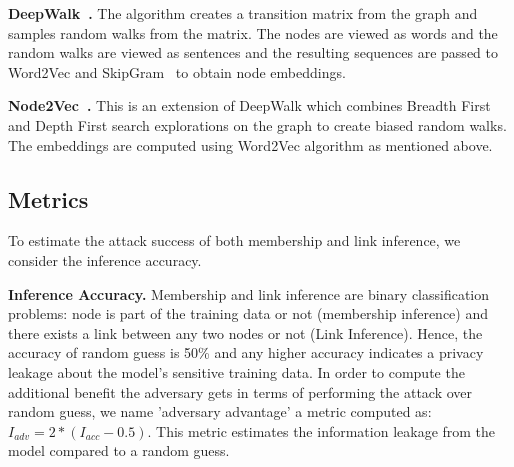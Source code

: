 \noindent\textbf{DeepWalk~\cite{deepwalk}.} The algorithm creates a transition matrix from the graph and samples random walks from the matrix.
The nodes are viewed as words and the random walks are viewed as sentences and the resulting sequences are passed to Word2Vec and SkipGram~\cite{wordemb} to obtain node embeddings.

\noindent\textbf{Node2Vec~\cite{node2vec}.} This is an extension of DeepWalk which combines Breadth First and Depth First search explorations on the graph to create biased random walks.
The embeddings are computed using Word2Vec algorithm as mentioned above.







\subsection{Metrics}


\noindent To estimate the attack success of both membership and link inference, we consider the inference accuracy.

\noindent\textbf{Inference Accuracy.} Membership and link inference are binary classification problems: node is part of the training data or not (membership inference) and there exists a link between any two nodes or not (Link Inference).
Hence, the accuracy of random guess is 50\% and any higher accuracy indicates a privacy leakage about the model's sensitive training data.
In order to compute the additional benefit the adversary gets in terms of performing the attack over random guess, we name 'adversary advantage' a metric computed as: $I_{adv} = 2*(I_{acc}-0.5)$.
This metric estimates the information leakage from the model compared to a random guess.



